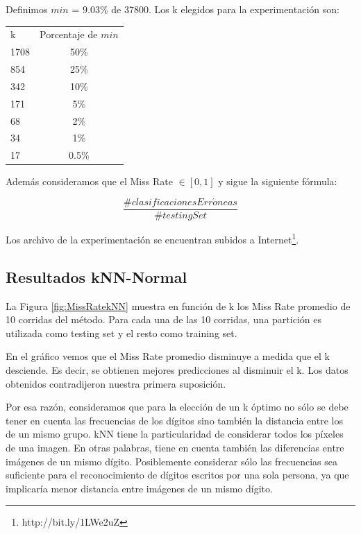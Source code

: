 \documentclass{article}
\begin{document}
Definimos $min$ = $9.03\%$ de 37800. Los k elegidos para la experimentación son: \newline

\begin{center}
\begin{tabular}{ l | c }
 k & Porcentaje de $min$  \\
1708 & 50\% \\
854 & 25\% \\
342 & 10\% \\
171 & 5\% \\
68 & 2\% \\
34 & 1\% \\
17& 0.5\% \\

\end{tabular}
\end{center}

Además consideramos que el Miss Rate $\in [0,1]$ y sigue la siguiente fórmula:

$$\frac{\#clasificacionesErr\acute{o}neas}{\#testingSet}$$

Los archivo de la experimentación se encuentran subidos a Internet\footnote{http://bit.ly/1LWe2uZ}.

\subsection*{Resultados kNN-Normal}

La Figura \ref{fig:MissRatekNN} muestra en función de k los Miss Rate promedio de 10 corridas del método. Para cada una de las 10 corridas, una partición es utilizada como testing set y el resto como training set.

En el gráfico vemos que el Miss Rate promedio disminuye a medida que el k desciende. Es decir, se obtienen mejores predicciones al disminuir el k. Los datos obtenidos contradijeron nuestra primera suposición.

Por esa razón, consideramos que para la elección de un k óptimo no sólo se debe tener en cuenta las frecuencias de los dígitos sino también la distancia entre los de un mismo grupo. kNN tiene la particularidad de considerar todos los píxeles de una imagen. En otras palabras, tiene en cuenta también las diferencias entre imágenes de un mismo dígito. Posiblemente considerar sólo las frecuencias sea suficiente para el reconocimiento de dígitos escritos por una sola persona, ya que implicaría menor distancia entre imágenes de un mismo dígito.
\end{document}
